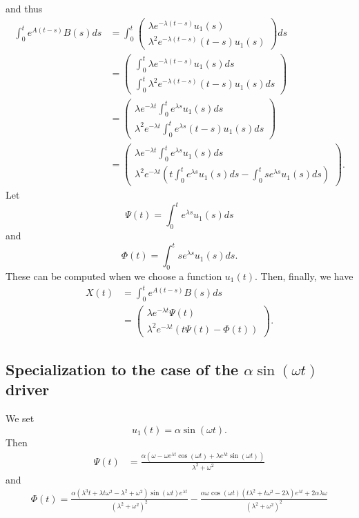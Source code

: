 and thus
\begin{align*}
\int_0^t e^{A(t-s)}B(s)ds &=
\int_0^t\left(
\begin{array}{ll}
\lambda e^{-\lambda(t-s)}u_1(s) \\
\lambda^2e^{-\lambda(t-s)} (t-s)u_1(s)
\end{array}
\right)ds \\
&= \left(\begin{array}{ll}
\int_0^t\lambda e^{-\lambda(t-s)}u_1(s) ds \\
\int_0^t\lambda^2e^{-\lambda(t-s)} (t-s)u_1(s) ds
\end{array}
\right) \\
&= \left(\begin{array}{ll}
\lambda e^{-\lambda t} \int_0^te^{\lambda s}u_1(s) ds \\
\lambda^2 e^{-\lambda t}\int_0^te^{\lambda s} (t-s)u_1(s) ds
\end{array}
\right) \\
&= \left(\begin{array}{ll}
\lambda e^{-\lambda t} \int_0^te^{\lambda s}u_1(s) ds \\
\lambda^2 e^{-\lambda t}\left(t\int_0^te^{\lambda s}u_1(s) ds
-\int_0^tse^{\lambda s} u_1(s) ds\right)
\end{array}
\right).
\end{align*}
Let
\[
\Psi(t)=\int_0^t e^{\lambda s} u_1(s)ds
\]
and
\[
\Phi(t)=\int_0^t se^{\lambda s} u_1(s)ds.
\]
These can be computed when we choose a function $u_1(t)$. Then, finally, we have
\begin{align*}
X(t) &= \int_0^t e^{A(t-s)}B(s)ds \\
&= \left(\begin{array}{ll}
\lambda e^{-\lambda t} \Psi(t) \\
\lambda^2 e^{-\lambda t}\left(t\Psi(t)
-\Phi(t)\right)
\end{array}
\right).
\end{align*}


\subsection{Specialization to the case of the $\alpha\sin(\omega t)$ driver}
We set
\[
u_1(t)=\alpha\sin(\omega t).
\]
Then
\begin{align*}
\Psi(t) &= \frac{\alpha (\omega-\omega e^{\lambda t} \cos(\omega t)+\lambda e^{\lambda t} \sin(\omega t))}{\lambda^2+\omega^2}
\end{align*}
and
\begin{align*}
\Phi(t) =\frac{\alpha(\lambda^3 t+\lambda t \omega^2-\lambda^2+\omega^2) \sin(\omega t) e^{\lambda t}}{(\lambda^2+\omega^2)^2}
-\frac{\alpha\omega \cos(\omega t) (t \lambda^2+t \omega^2-2 \lambda) e^{\lambda t}+2\alpha \lambda \omega}{(\lambda^2+\omega^2)^2}
\end{align*}


